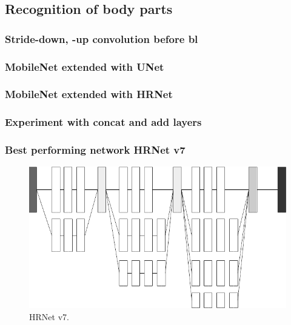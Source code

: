 \subsection{Recognition of body parts }
\label{RBP}

\subsubsection{Stride-down, -up convolution before \gls{bl}}

\subsubsection{MobileNet extended with UNet}
\subsubsection{MobileNet extended with HRNet}

\subsubsection{Experiment with concat and add layers}

\subsubsection{Best performing network HRNet v7}

\begin{figure}[H]
    \centering
    \includegraphics[width=\textwidth,height=\textheight,keepaspectratio]{img/network_v7_hrnet.png}
    \decoRule
    \caption[HRNet v7]{HRNet v7.}
    \label{fig:hrnet-v7}
\end{figure}





